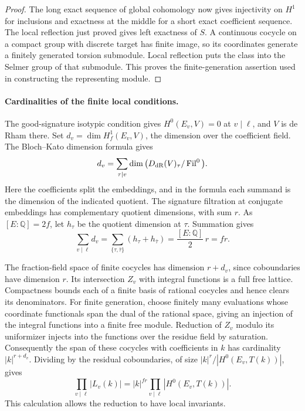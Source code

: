 \begin{proof}
The long exact sequence of
global cohomology now gives injectivity on \(H^1\) for
inclusions and exactness at the middle for a short exact
coefficient sequence. The local reflection just proved gives
left exactness of \(S\). A continuous cocycle on a compact
group with discrete target has finite image, so its coordinates
generate a finitely generated torsion submodule. Local reflection
puts the class into the Selmer group of that submodule. This
proves the finite-generation assertion used in constructing
the representing module.
\end{proof}

\paragraph{Cardinalities of the finite local conditions.}
The good-signature isotypic condition gives \(H^0(E_v,V)=0\)
at \(v\mid\ell\), and \(V\) is de Rham there. Set
\(d_v=\dim H^1_f(E_v,V)\), the dimension over the coefficient
field. The Bloch--Kato dimension formula gives
\[
 d_v=\sum_{\tau\mid v}\dim\big(D_{\rm dR}(V)_\tau/
                                      \operatorname{Fil}^0\big).
\]
Here the coefficients split the embeddings, and in the formula
each summand is the dimension of the indicated quotient.
The signature filtration at conjugate embeddings has complementary
quotient dimensions, with sum \(r\). As \([E:\mathbb Q]=2f\),
let \(h_\tau\) be the quotient dimension at \(\tau\). Summation gives
\[
 \sum_{v\mid\ell}d_v
   =\sum_{\{\tau,\bar\tau\}}(h_\tau+h_{\bar\tau})
   =\frac{[E:\mathbb Q]}2\,r=fr .
\]
\cite{bloch-kato}

The fraction-field space of finite cocycles has dimension
\(r+d_v\), since coboundaries have dimension \(r\). Its
intersection \(Z_v\) with integral functions is a full free
lattice. Compactness bounds each of a finite basis of rational
cocycles and hence clears its denominators. For finite generation,
choose finitely many evaluations whose coordinate functionals
span the dual of the rational space, giving an injection of
the integral functions into a finite free module. Reduction of
\(Z_v\) modulo its uniformizer injects into the functions
over the residue field by saturation. Consequently the span
of these cocycles with coefficients in \(k\) has cardinality
\(|k|^{r+d_v}\). Dividing by the residual coboundaries, of
size \(|k|^r/|H^0(E_v,T(k))|\), gives
\begin{equation}\label{eq:signature-local-size}
  \prod_{v\mid\ell}|L_v(k)|
   =|k|^{fr}\prod_{v\mid\ell}|H^0(E_v,T(k))|.
\end{equation}
This calculation allows the reduction to have local invariants.


